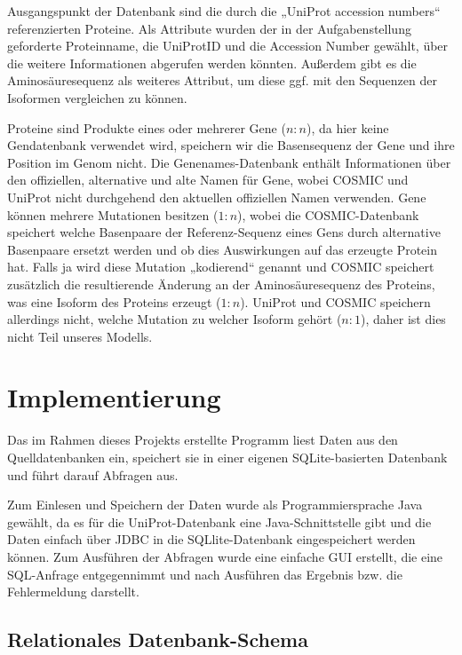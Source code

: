 \documentclass{scrartcl}
\begin{document}
Ausgangspunkt der Datenbank sind die durch die „UniProt accession numbers“ referenzierten Proteine. Als Attribute wurden der in der Aufgabenstellung geforderte Proteinname, die UniProtID und die Accession Number gewählt, über die weitere Informationen abgerufen werden könnten. Außerdem gibt es die Aminosäuresequenz als weiteres Attribut, um diese ggf. mit den Sequenzen der Isoformen vergleichen zu können.

Proteine sind Produkte eines oder mehrerer Gene ($n:n$), da hier keine Gendatenbank verwendet wird, speichern wir die Basensequenz der Gene und ihre Position im Genom nicht. Die Genenames-Datenbank enthält Informationen über den offiziellen, alternative und alte Namen für Gene, wobei COSMIC und UniProt nicht durchgehend den aktuellen offiziellen Namen verwenden. Gene können mehrere Mutationen besitzen ($1:n$), wobei die COSMIC-Datenbank speichert welche Basenpaare der Referenz-Sequenz eines Gens durch alternative Basenpaare ersetzt werden und ob dies Auswirkungen auf das erzeugte Protein hat. Falls ja wird diese Mutation „kodierend“ genannt und COSMIC speichert zusätzlich die resultierende Änderung an der Aminosäuresequenz des Proteins, was eine Isoform des Proteins erzeugt ($1:n$). UniProt und COSMIC speichern allerdings nicht, welche Mutation zu welcher Isoform gehört ($n:1$), daher ist dies nicht Teil unseres Modells.

\newpage
\section{Implementierung}

Das im Rahmen dieses Projekts erstellte Programm liest Daten aus den Quelldatenbanken ein, speichert sie in einer eigenen SQLite-basierten Datenbank und führt darauf Abfragen aus.

Zum Einlesen und Speichern der Daten wurde als Programmiersprache Java gewählt, da es für die UniProt-Datenbank eine Java-Schnittstelle gibt und die Daten einfach über JDBC in die SQLlite-Datenbank eingespeichert werden können. Zum Ausführen der Abfragen wurde eine einfache GUI erstellt, die eine SQL-Anfrage entgegennimmt und nach Ausführen das Ergebnis bzw. die Fehlermeldung darstellt.

\subsection{Relationales Datenbank-Schema}
\end{document}
